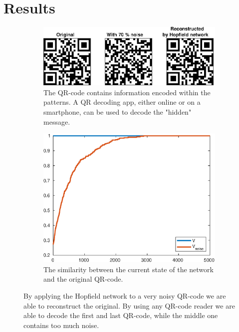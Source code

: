 \section{Results}

\begin{figure}[H]
    \centering
    \begin{subfigure}{0.55\textwidth}
        \includegraphics[width=\textwidth]{figs/qr-code}
        \caption{The QR-code contains information encoded within the patterns. A QR decoding app, either online or on a smartphone, can be used to decode the "hidden" message.}
    \end{subfigure}
    \begin{subfigure}{0.4\textwidth}
        \includegraphics[width=\textwidth]{figs/qr-code-sim}
        \caption{The similarity between the current state of the network and the original QR-code.}
    \end{subfigure}
    \caption{By applying the Hopfield network to a very noisy QR-code we are able to reconstruct the original. By using any QR-code reader we are able to decode the first and last QR-code, while the middle one contains too much noise.}
\end{figure}